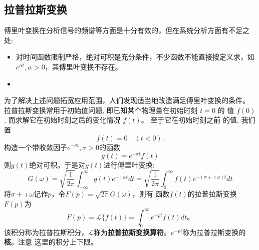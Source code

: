 \subsection{拉普拉斯变换}
\label{subsec:laplace_transform}

傅里叶变换在分析信号的频谱等方面是十分有效的，但在系统分析方面有不足之处:

\begin{itemize}
    \item 对时间函数限制严格，绝对可积是充分条件，不少函数不能直接按定义求，如$e^{\alpha t}, \alpha > 0$，其傅里叶变换不存在。

    \item  
\end{itemize}
为了解决上述问题拓宽应用范围，人们发现适当地改造满足傅里叶变换的条件。
拉普拉斯变换常用于初始值问题, 即已知某个物理量在初始时刻 $t=0$ 的 值 $f(0)$, 而求解它在初始时刻之后的变化情况 $f(t)$。
 至于它在初始时刻之前 的值, 我们置
$$
f(t)=0 \quad(t<0) .
$$
构造一个带收敛因子$e^{-\sigma t}, \sigma > 0$的函数
$$
g(t) =e^{-\sigma t} f(t)
$$
则$g(t)$绝对可积。于是对$g(t)$进行傅里叶变换:
\begin{equation}
    G(\omega) = \sqrt{\frac{1}{2\pi} } \int_{-\infty}^{\infty} g(t) e^{-\imath \omega t} dt 
    = \sqrt{\frac{1}{2\pi} } \int_{0}^{\infty} f(t) e^{-(\sigma + \imath \omega) t} dt  
\end{equation}
将$\sigma + \imath \omega$记作$p$，令$F(p)=\sqrt{2\pi}G(\omega)$，则有
函数$f(t)$的拉普拉斯变换$F(p)$为
\begin{equation}
    F(p) = \mathcal{L} \{ f(t) \} = \int_0 ^{\infty} e^{-pt} f(t) dt \textrm{。}
\end{equation}
该积分称为拉普拉斯积分，$\mathcal{L}$称为\textbf{拉普拉斯变换算符}。$e^{-pt}$称为拉普拉斯变换的\textbf{核}。注意
这里的积分上下限。